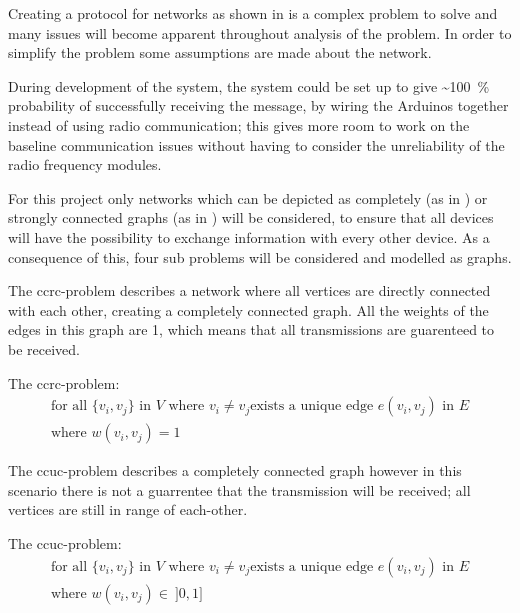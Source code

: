 \noindent
Creating a protocol for networks as shown in  is a complex problem to solve and many issues will become apparent throughout analysis of the problem.
In order to simplify the problem some assumptions are made about the network.

During development of the system, the system could be set up to give \textasciitilde100~\% probability of successfully receiving the message, by wiring the Arduinos together instead of using radio communication; this gives more room to work on the baseline communication issues without having to consider the unreliability of the radio frequency modules.

For this project only networks which can be depicted as completely (as in ) or strongly connected graphs (as in ) will be considered, to ensure that all devices will have the possibility to exchange information with every other device.
As a consequence of this, four sub problems will be considered and modelled as graphs.

\bigskip

\noindent The \gls{ccrc}-problem describes a network where all vertices are directly connected with each other, creating a completely connected graph.
All the weights of the edges in this graph are 1, which means that all transmissions are guarenteed to be received. 	

\begin{definition}\label{CCRCdef}
	The \acrshort{ccrc}-problem:
	\begin{align*}
		\text{for all } \{v_i, v_j\} \text{ in } V \text{ where } v_i \neq v_j \text{exists a unique edge } e(v_i, v_j) \text{ in } E\\
		\text{where } w(v_i, v_j) = 1
	\end{align*}
\end{definition}

\noindent The \gls{ccuc}-problem describes a completely connected graph however in this scenario there is not a guarrentee that the transmission will be received; all vertices are still in range of each-other.

\begin{definition}
	The \acrshort{ccuc}-problem:
	\begin{align*}
		\text{for all } \{v_i, v_j\} \text{ in } V \text{ where } v_i \neq v_j \text{exists a unique edge } e(v_i, v_j) \text{ in } E\\
		\text{where } w(v_i, v_j) \in\ ]0, 1]
	\end{align*}
\end{definition} 

